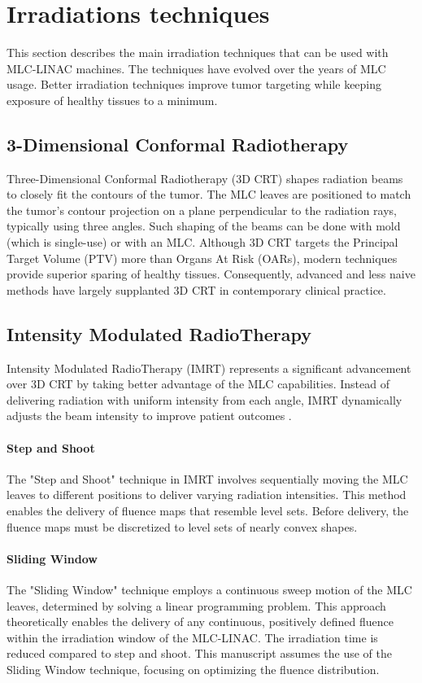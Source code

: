 \section{Irradiations techniques}
This section describes the main irradiation techniques that can be used with MLC-LINAC machines.
The techniques have evolved over the years of MLC usage.
Better irradiation techniques improve tumor targeting while keeping exposure of healthy tissues to a minimum.

\subsection[3D-CRT]{3-Dimensional Conformal Radiotherapy}
Three-Dimensional Conformal Radiotherapy (3D CRT) shapes radiation beams to closely fit the contours of the tumor.
The MLC leaves are positioned to match the tumor's contour projection on a plane perpendicular to the radiation rays, typically using three angles.
Such shaping of the beams can be done with mold (which is single-use) or with an MLC.
Although 3D CRT targets the Principal Target Volume (PTV) more than Organs At Risk (OARs), modern techniques provide superior sparing of healthy tissues.
Consequently, advanced and less naive methods have largely supplanted 3D CRT in contemporary clinical practice.

\subsection[IMRT]{Intensity Modulated RadioTherapy}
Intensity Modulated RadioTherapy (IMRT) represents a significant advancement over 3D CRT by taking better advantage of the  MLC capabilities.
Instead of delivering radiation with uniform intensity from each angle, IMRT dynamically adjusts the beam intensity to improve patient outcomes \cite{Tubiana2000}.

\paragraph[S\&S]{Step and Shoot}
The "Step and Shoot" technique in IMRT involves sequentially moving the MLC leaves to different positions to deliver varying radiation intensities.
This method enables the delivery of fluence maps that resemble level sets. 
Before delivery, the fluence maps must be discretized to level sets of nearly convex shapes.


\paragraph[SW]{Sliding Window}
The "Sliding Window" technique employs a continuous sweep motion of the MLC leaves, determined by solving a linear programming problem.
This approach theoretically enables the delivery of any continuous, positively defined fluence within the irradiation window of the MLC-LINAC.
The irradiation time is reduced compared to step and shoot.
This manuscript assumes the use of the Sliding Window technique, focusing on optimizing the fluence distribution.

